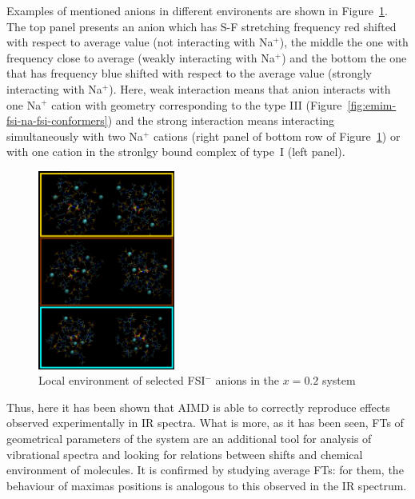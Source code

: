 Examples of mentioned anions in different environents are shown in Figure~\ref{fig:emim-fsi-environments}. The top panel presents an anion which has S-F stretching frequency red shifted with respect to average value (not interacting with Na$^{+}$), the middle the one with frequency close to average (weakly interacting with Na$^{+}$) and the bottom the one that has frequency blue shifted with respect to the average value (strongly interacting with Na$^{+}$). Here, weak interaction means that anion interacts with one Na$^{+}$ cation with geometry corresponding to the type III (Figure~\ref{fig:emim-fsi-na-fsi-conformers}) and the strong interaction means interacting simultaneously with two Na$^{+}$ cations (right panel of bottom row of Figure~\ref{fig:emim-fsi-environments}) or with one cation in the stronlgy bound complex of type~I (left panel).

\begin{figure}[ht]
    \centering
    \includegraphics[width=0.4\textwidth]{img/4-ir-spectra-from-aimd-simulations/1-emim-fsi/environments.png}
    \caption{Local environment of selected FSI$^{-}$ anions in the $x = 0.2$ system}
    \label{fig:emim-fsi-environments}
\end{figure}

Thus, here it has been shown that AIMD is able to correctly reproduce effects observed experimentally in IR spectra. What is more, as it has been seen, FTs of geometrical parameters of the system are an additional tool for analysis of vibrational spectra and looking for relations between shifts and chemical environment of molecules. It is confirmed by studying average FTs: for them, the behaviour of maximas positions is analogous to this observed in the IR spectrum.

\cleardoublepage